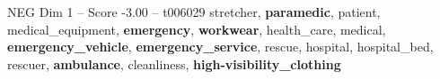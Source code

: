 \begin{textsample}{NEG Dim 1 – Score -3.00 – t006029}  \label{ex:f1_neg_029}
stretcher, \textbf{paramedic}, patient, medical\_equipment, \textbf{emergency}, \textbf{workwear}, health\_care, medical, \textbf{emergency\_vehicle}, \textbf{emergency\_service}, rescue, hospital, hospital\_bed, rescuer, \textbf{ambulance}, cleanliness, \textbf{high-visibility\_clothing}

\end{textsample}
